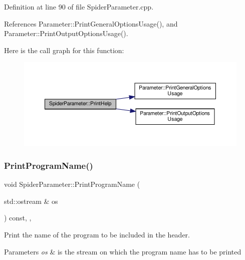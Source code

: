 Definition at line 90 of file Spider\+Parameter.\+cpp.



References Parameter\+::\+Print\+General\+Options\+Usage(), and Parameter\+::\+Print\+Output\+Options\+Usage().

Here is the call graph for this function\+:
\nopagebreak
\begin{figure}[H]
\begin{center}
\leavevmode
\includegraphics[width=350pt]{dc/d95/classSpiderParameter_a8021f729e9e68cdacaa9ae2105b565ba_cgraph}
\end{center}
\end{figure}
\mbox{\label{classSpiderParameter_a494cc1a863c33c3048b69969019fd6f9}} 
\subsubsection{\texorpdfstring{Print\+Program\+Name()}{PrintProgramName()}}
{\footnotesize\ttfamily void Spider\+Parameter\+::\+Print\+Program\+Name (\begin{DoxyParamCaption}\item[{std\+::ostream \&}]{os }\end{DoxyParamCaption}) const\hspace{0.3cm}{\ttfamily [override]}, {\ttfamily [private]}, {\ttfamily [virtual]}}



Print the name of the program to be included in the header. 


\begin{DoxyParams}{Parameters}
{\em os} & is the stream on which the program name has to be printed \\
\hline
\end{DoxyParams}


